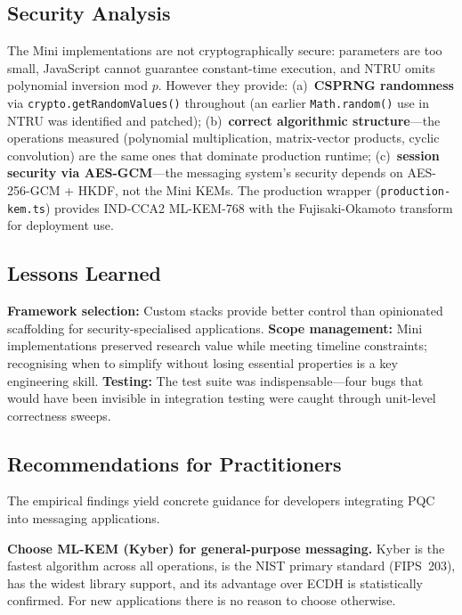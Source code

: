 \documentclass[11pt,a4paper]{article}
\begin{document}
\subsection{Security Analysis}

The Mini implementations are not cryptographically secure: parameters are too small, JavaScript cannot guarantee constant-time execution, and NTRU omits polynomial inversion mod $p$. However they provide: (a)~\textbf{CSPRNG randomness} via \texttt{crypto.getRandomValues()} throughout (an earlier \texttt{Math.random()} use in NTRU was identified and patched); (b)~\textbf{correct algorithmic structure}---the operations measured (polynomial multiplication, matrix-vector products, cyclic convolution) are the same ones that dominate production runtime; (c)~\textbf{session security via AES-GCM}---the messaging system's security depends on AES-256-GCM + HKDF, not the Mini KEMs. The production wrapper (\texttt{production-kem.ts}) provides IND-CCA2 ML-KEM-768 with the Fujisaki-Okamoto transform for deployment use.

\subsection{Lessons Learned}

\textbf{Framework selection:} Custom stacks provide better control than opinionated scaffolding for security-specialised applications. \textbf{Scope management:} Mini implementations preserved research value while meeting timeline constraints; recognising when to simplify without losing essential properties is a key engineering skill. \textbf{Testing:} The test suite was indispensable---four bugs that would have been invisible in integration testing were caught through unit-level correctness sweeps.

\subsection{Recommendations for Practitioners}

The empirical findings yield concrete guidance for developers integrating PQC into messaging applications.

\textbf{Choose ML-KEM (Kyber) for general-purpose messaging.} Kyber is the fastest algorithm across all operations, is the NIST primary standard (FIPS~203), has the widest library support, and its advantage over ECDH is statistically confirmed. For new applications there is no reason to choose otherwise.
\end{document}
